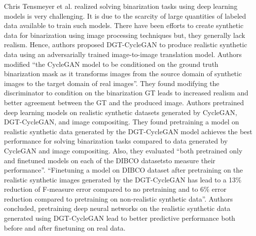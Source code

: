 Chris Tensmeyer et al.\cite{8978087} realized solving binarization tasks using deep learning models is very challenging. It is due to the scarcity of large quantities of labeled data available to train such models. There have been efforts to create synthetic data for binarization using image processing techniques but, they generally lack realism\cite{8978087}. Hence, authors proposed DGT-CycleGAN to produce realistic synthetic data using an adversarially trained image-to-image translation model\cite{8978087}. Authors modified ``the \ac{CycleGAN} model to be conditioned on the ground truth binarization mask as it transforms images from the source domain of synthetic images to the target domain of real images''\cite{8978087}. They found modifying the discriminator to condition on the binarization \ac{GT} leads to increased realism and better agreement between the \ac{GT} and the produced image\cite{8978087}.  Authors pretrained deep learning models on realistic synthetic datasets generated by \ac{CycleGAN}, DGT-CycleGAN, and image compositing\cite{8978087}. They found pretraining a model on realistic synthetic data generated by the DGT-CycleGAN model achieves the best performance for solving binarization tasks compared to data generated by \ac{CycleGAN} and image compositing\cite{8978087}. Also, they evaluated ``both pretrained only and finetuned models on each of the \ac{DIBCO} datasets\footnotemark to measure their performance''\cite{8978087}. ``Finetuning a model on \ac{DIBCO} dataset after pretraining on the realistic synthetic images generated by the DGT-CycleGAN has lead to a 13\% reduction of F-measure error compared to no pretraining and to 6\% error reduction compared to pretraining on non-realistic synthetic data''\cite{8978087}. Authors concluded, pretraining deep neural networks on the realistic synthetic data generated using DGT-CycleGAN lead to better predictive performance both before and after finetuning on real data.



